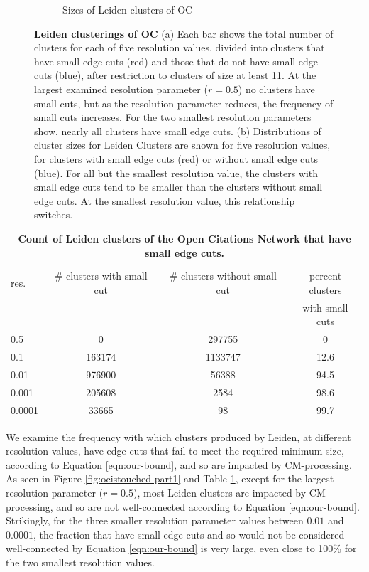 \documentclass[11pt]{article}   	%
\begin{document}
\begin{figure}[H]
\begin{subfigure}[t]{0.45\textwidth}
\begin{center}
\caption{Sizes of Leiden clusters of OC}
\end{center}
\label{fig:ocistouched-part2}
\end{subfigure}
\caption{\textbf {Leiden clusterings of OC} (a)
Each bar shows the total number of clusters for each of five resolution values, divided into clusters that have small edge cuts (red)  and those that do not have small edge cuts (blue), after restriction  to clusters of size at least 11. At the largest examined resolution parameter ($r=0.5$) no clusters have small cuts, but  as the resolution parameter reduces, the frequency of  small cuts increases.
For the two smallest resolution parameters show, nearly all clusters have small edge cuts.
(b)  Distributions of cluster sizes  for Leiden Clusters are shown for five resolution values, for clusters with small edge cuts (red) or without small edge cuts (blue). For all but the smallest resolution value, the clusters with small edge cuts tend to be smaller than the clusters without small edge cuts. At the smallest resolution value, this relationship switches.}
\end{figure}



\begin{table}[ht]
\centering
\begin{tabular}{lccc}
  \hline
 res. & \# clusters with small cut & \# clusters without  small cut & percent clusters   \\
 & & & with small cuts \\
  \hline
  0.5 & 0 & 297755 & 0 \\
   0.1 & 163174 & 1133747 & 12.6  \\
    0.01 & 976900 & 56388 & 94.5\\
    0.001 & 205608 & 2584 & 98.6 \\
   0.0001 & 33665 &  98 & 99.7 \\
   \hline
\end{tabular}
\caption{\textbf{Count of Leiden clusters of the Open Citations Network that have small edge cuts.}}
\label{tab:ocistouched-part1}
\end{table}


We examine the frequency with which clusters produced by Leiden, at different resolution values, have edge cuts that fail to meet the required minimum size, according to Equation \ref{eqn:our-bound}, and so are  impacted by CM-processing.
As seen in Figure \ref{fig:ocistouched-part1} and Table \ref{tab:ocistouched-part1}, except for the largest resolution parameter ($r=0.5$), most Leiden clusters are impacted by CM-processing, and so are not well-connected according to Equation \ref{eqn:our-bound}.
Strikingly, for the three smaller resolution parameter values between $0.01$ and $0.0001$, the fraction that have small edge cuts and so would not be considered well-connected by Equation \ref{eqn:our-bound} is very large, even close to 100\% for the two smallest resolution values.
\end{document}
